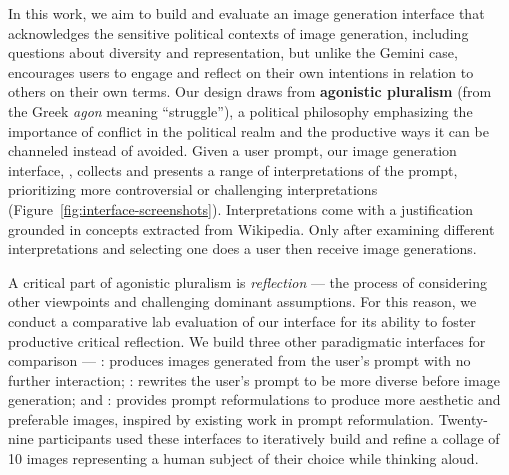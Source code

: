 In this work, we aim to build and evaluate an image generation interface that acknowledges the sensitive political contexts of image generation, including questions about diversity and representation, but unlike the Gemini case, encourages users to engage and reflect on their own intentions in relation to others on their own terms.
Our design draws from \textbf{agonistic pluralism} (from the Greek \textit{agon} meaning ``struggle''), a political philosophy emphasizing the importance of conflict in the political realm and the productive ways it can be channeled instead of avoided.
Given a user prompt, our image generation interface, \agonistic, collects and presents a range of interpretations of the prompt, prioritizing more controversial or challenging interpretations (Figure~\ref{fig:interface-screenshots}).
Interpretations come with a justification grounded in concepts extracted from Wikipedia.
Only after examining different interpretations and selecting one does a user then receive image generations.

A critical part of agonistic pluralism is \textit{reflection} --- the process of considering other viewpoints and challenging dominant assumptions. 
For this reason, we conduct a comparative lab evaluation of our interface for its ability to foster productive critical reflection.
We build three other paradigmatic interfaces for comparison --- 
\baseline: produces images generated from the user's prompt with no further interaction;
\diverse: rewrites the user's prompt to be more diverse before image generation;
and : provides prompt reformulations to produce more aesthetic and preferable images, inspired by existing work in prompt reformulation.
Twenty-nine participants used these interfaces to iteratively build and refine a collage of 10 images representing a human subject of their choice while thinking aloud. 

